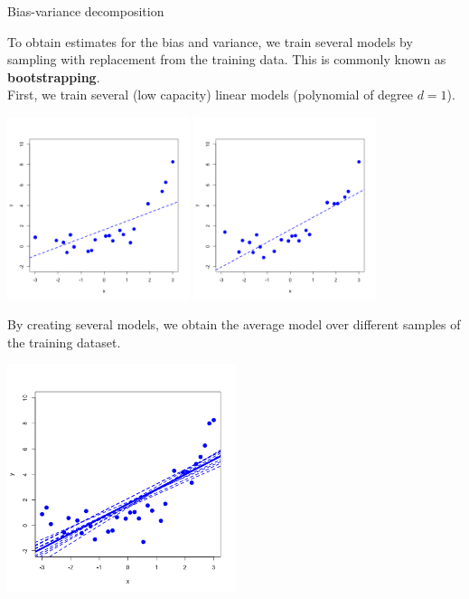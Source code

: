 \documentclass[11pt,compress,t,notes=noshow, xcolor=table]{beamer}
\begin{document}
\begin{vbframe} {Bias-variance decomposition}
\framebreak

To obtain estimates for the bias and variance, we train several models by sampling with replacement from the training data. This is commonly known as \textbf{bootstrapping}. \\
\vspace{0.3cm}
First, we train several (low capacity) linear models (polynomial of degree $d=1$).

\begin{center}
  \includegraphics[width = 0.4\textwidth]{figure/bias_variance_decomposition-bootstrap_1.png}
  \includegraphics[width = 0.4\textwidth]{figure/bias_variance_decomposition-bootstrap_2.png}
\end{center}

\framebreak

By creating several models, we obtain the average model over different samples of the training dataset.

\begin{center}
  \includegraphics[width = 0.5\textwidth]{figure/bias_variance_decomposition-linear_model.png}
\end{center}


\end{vbframe}
\end{document}

